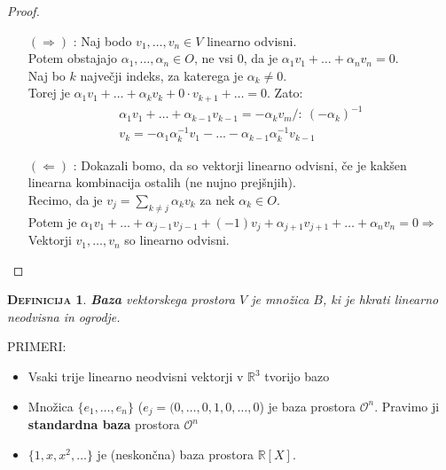 \documentclass[a4paper,12pt]{article}
\newtheorem*{definicija}{\textsc{Definicija}}
\begin{document}
\begin{proof}~

\begin{itemize}
\item[$(\Rightarrow)$]:
Naj bodo $v_1,\ldots,v_n\in V$ linearno odvisni. \\

Potem obstajajo $\alpha_1,\ldots,\alpha_n\in O$, ne vsi 0, da je $\alpha_1v_1+\ldots+\alpha_nv_n=0$. \\

Naj bo $k$ največji indeks, za katerega je $\alpha_k\neq0$. \\

Torej je $\alpha_1v_1+\ldots+\alpha_kv_k+0\cdot v_{k+1}+\ldots=0$. Zato:
\begin{gather*}
\alpha_1v_1+\ldots+\alpha_{k-1}v_{k-1}=-\alpha_kv_m / :~(-\alpha_k)^{-1} \\
v_k=-\alpha_1\alpha_k^{-1}v_1-\ldots-\alpha_{k-1}\alpha_k^{-1}v_{k-1}
\end{gather*}
\item[$(\Leftarrow)$]:
Dokazali bomo, da so vektorji linearno odvisni, če je kakšen linearna kombinacija ostalih (ne nujno prejšnjih). \\

Recimo, da je $v_j=\sum_{k\neq j}\alpha_kv_k$ za nek $\alpha_k\in O$. \\

Potem je $\alpha_1v_1+\ldots+\alpha_{j-1}v_{j-1}+(-1)v_j+\alpha_{j+1}v_{j+1}+\ldots+\alpha_nv_n=0 \Rightarrow$ Vektorji $v_1,\ldots,v_n$ so linearno odvisni.
\end{itemize}
\end{proof}

\begin{definicija}
\textbf{Baza} vektorskega prostora $V$ je množica $B$, ki je hkrati linearno neodvisna in ogrodje.\\ 
\end{definicija}

\newpage 

\noindent PRIMERI:
\begin{itemize}
\item Vsaki trije linearno neodvisni vektorji v $\mathbb{R}^3$ tvorijo bazo
\item Množica $\{e_1,\ldots,e_n\}$ ($e_j=(0,\ldots,0,1,0,\ldots,0$) je baza prostora $\mathcal{O} ^n$. Pravimo ji \textbf{standardna baza} prostora $\mathcal{O} ^n$
\item $\{1,x,x^2,\ldots\}$ je (neskončna) baza prostora $\mathbb{R}[X]$.\\
\end{itemize}
\end{document}
